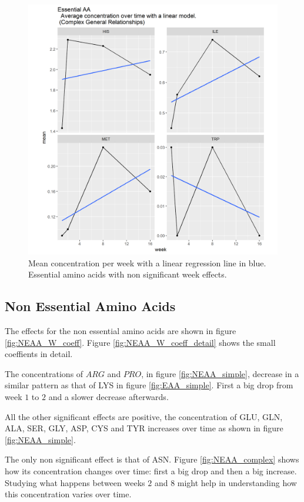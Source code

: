 \documentclass[12pt]{article}
\begin{document}
\begin{figure}[!htb]
  \includegraphics[width= \textwidth]{../week/EAA_complex.png}
  \caption{Mean concentration per week with a linear regression line in blue. Essential amino acids with non significant week effects.}
  \label{fig:EAA_complex}
\end{figure}

\subsection{Non Essential Amino Acids}

The effects for the non essential amino acids are shown in figure \ref{fig:NEAA_W_coeff}. Figure \ref{fig:NEAA_W_coeff_detail} shows the small coeffients in detail.

The concentrations of $ARG$ and $PRO$, in figure \ref{fig:NEAA_simple}, decrease in a similar pattern as that of LYS in figure \ref{fig:EAA_simple}. First a big drop from week $1$ to $2$ and a slower decrease afterwards.

All the other significant effects are positive, the concentration of GLU, GLN, ALA, SER, GLY, ASP, CYS and TYR increases over time as shown in figure \ref{fig:NEAA_simple}.

The only non significant effect is that of ASN. Figure \ref{fig:NEAA_complex} shows how its concentration changes over time: first a big drop and then a big increase. Studying what happens between weeks $2$ and $8$ might help in understanding how this concentration varies over time.
\end{document}

